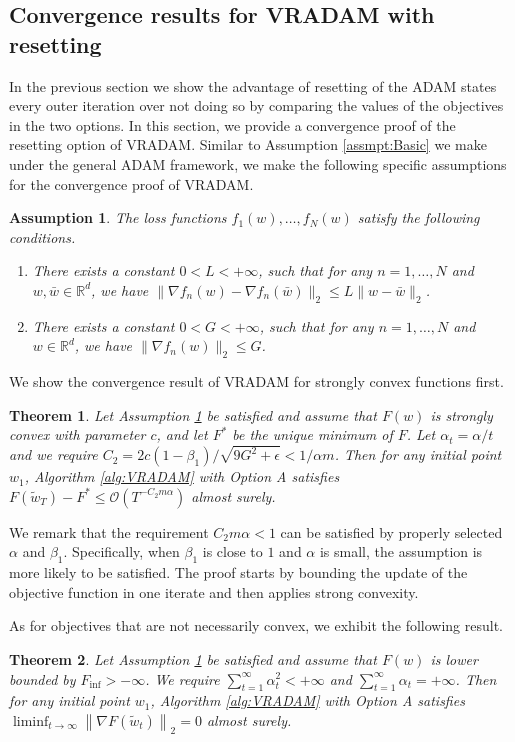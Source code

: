 \documentclass[twoside]{article}
\def\RR{\mathbb{R}}
\def\OO{\mathcal{O}}
\newtheorem{assumption}{Assumption}
\newtheorem{theorem}{Theorem}
\begin{document}
\subsection{Convergence results for VRADAM with resetting}
In the previous section we show the advantage of resetting of the ADAM states every outer iteration over not doing so by comparing the values of the objectives in the two options. In this section, we provide a convergence proof of the resetting option of VRADAM. Similar to Assumption \ref{assmpt:Basic} we make under the general ADAM framework, we make the following specific assumptions for the convergence proof of VRADAM.
\begin{assumption}
\label{assmpt:VRADAM}
The loss functions $f_1(w),\ldots,f_N(w)$ satisfy the following conditions.
\begin{enumerate}
    \item There exists a constant $0<L<+\infty$, such that for any $n=1,\ldots,N$ and $w,\bar w\in\RR^d$, we have $\|\nabla f_n(w) -\nabla f_n(\bar w)\|_2 \leq L\|w-\bar w\|_2$.
    \item There exists a constant $0<G<+\infty$, such that for any $n=1,\ldots,N$ and $w\in\RR^d$, we have $\|\nabla f_n(w)\|_2\leq G$.
\end{enumerate}
\end{assumption}
We show the convergence result of VRADAM for strongly convex functions first.
\begin{theorem}
\label{thm:VRStrCvx}
Let Assumption \ref{assmpt:VRADAM} be satisfied and assume that $F(w)$ is strongly convex with parameter $c$, and let $F^*$ be the unique minimum of $F$. Let $\alpha_t = \alpha/t$ and we require $C_2 = 2c(1-\beta_1)/\sqrt{9G^2 + \epsilon}< 1/\alpha m$. Then for any initial point $w_1$, Algorithm \ref{alg:VRADAM} with Option A satisfies $ F(\widetilde w_T) - F^* \leq \OO\left( T^{-C_2m\alpha}\right)$ almost surely.
\end{theorem}
We remark that the requirement $C_2 m \alpha < 1$ can be satisfied by properly selected $\alpha$ and $\beta_1$. Specifically, when $\beta_1$ is close to $1$ and $\alpha$ is small, the assumption is more likely to be satisfied. The proof starts by bounding the update of the objective function in one iterate and then applies strong convexity.

As for objectives that are not necessarily convex, we exhibit the following result.
\begin{theorem}
\label{thm:VRNonCvx}
Let Assumption \ref{assmpt:VRADAM} be satisfied and assume that $F(w)$ is lower bounded by $F_\mathrm{inf}>-\infty$. We require $\sum_{t=1}^\infty \alpha_t^2 < +\infty$ and $\sum_{t=1}^\infty \alpha_t = +\infty$. Then for any initial point $w_1$, Algorithm \ref{alg:VRADAM} with Option A satisfies $\liminf_{t\to\infty} \left\|\nabla F(\tilde w_t)\right\|_2 =0$ almost surely.
\end{theorem}
\end{document}
